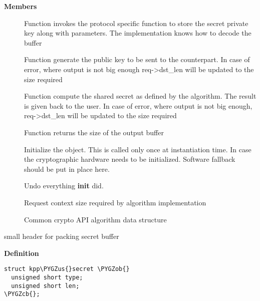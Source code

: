 \documentclass[a4paper,8pt,english]{sphinxmanual}
\def\PYGZus{\char`\_}
\def\PYGZob{\char`\{}
\def\PYGZcb{\char`\}}
\begin{document}
\textbf{Members}
\begin{description}
\item[{}] \leavevmode
Function invokes the protocol specific function to
store the secret private key along with parameters.
The implementation knows how to decode the buffer

\item[{}] \leavevmode
Function generate the public key to be sent to the
counterpart. In case of error, where output is not big
enough req-\textgreater{}dst\_len will be updated to the size
required

\item[{}] \leavevmode
Function compute the shared secret as defined by
the algorithm. The result is given back to the user.
In case of error, where output is not big enough,
req-\textgreater{}dst\_len will be updated to the size required

\item[{}] \leavevmode
Function returns the size of the output buffer

\item[{}] \leavevmode
Initialize the object. This is called only once at
instantiation time. In case the cryptographic hardware
needs to be initialized. Software fallback should be
put in place here.

\item[{}] \leavevmode
Undo everything \textbf{init} did.

\item[{}] \leavevmode
Request context size required by algorithm
implementation

\item[{}] \leavevmode
Common crypto API algorithm data structure

\end{description}

\begin{fulllineitems}
\label{crypto/api-kpp:c.kpp_secret}
small header for packing secret buffer

\end{fulllineitems}


\textbf{Definition}

\begin{Verbatim}[commandchars=\\\{\}]
struct kpp\PYGZus{}secret \PYGZob{}
  unsigned short type;
  unsigned short len;
\PYGZcb{};
\end{Verbatim}
\end{document}
